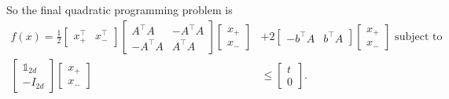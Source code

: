 \documentclass{letter}
\newcounter{problem}
\newcommand{\T}{\intercal}
\begin{document}
{    So the final quadratic programming problem is \begin{align*}
        f(x) = \frac{1}{2}\begin{bmatrix} x^\T_+ & x^\T_- \end{bmatrix} \begin{bmatrix} A^\T A & -A^\T A \\ -A^\T A & A^\T A \end{bmatrix} \begin{bmatrix} x_+ \\ x_- \end{bmatrix} &+ 2\begin{bmatrix} -b^\T A & b^\T A \end{bmatrix} \begin{bmatrix} x_+ \\ x_- \end{bmatrix}  \text{ subject to} \\
        \begin{bmatrix} \mathbb{1}_{2d} \\ -I_{2d} \end{bmatrix} \begin{bmatrix} x_+ \\ x_- \end{bmatrix} &\leq \begin{bmatrix} t \\ 0 \end{bmatrix}.
    \end{align*}}
\end{document}
